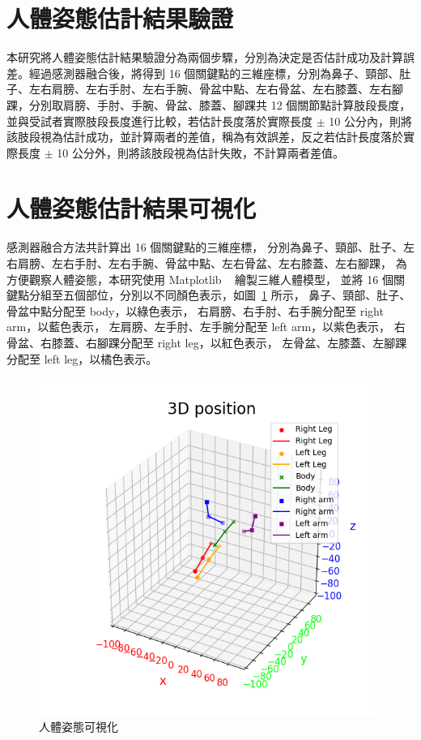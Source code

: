 \section{人體姿態估計結果驗證}
本研究將人體姿態估計結果驗證分為兩個步驟，分別為決定是否估計成功及計算誤差。經過感測器融合後，將得到 16 個關鍵點的三維座標，分別為鼻子、頸部、肚子、左右肩膀、左右手肘、左右手腕、骨盆中點、左右骨盆、左右膝蓋、左右腳踝，分別取肩膀、手肘、手腕、骨盆、膝蓋、腳踝共 12 個關節點計算肢段長度，並與受試者實際肢段長度進行比較，若估計長度落於實際長度 $\pm$ 10 公分內，則將該肢段視為估計成功，並計算兩者的差值，稱為有效誤差，反之若估計長度落於實際長度 $\pm$ 10 公分外，則將該肢段視為估計失敗，不計算兩者差值。

\section{人體姿態估計結果可視化}
感測器融合方法共計算出 16 個關鍵點的三維座標，
分別為鼻子、頸部、肚子、左右肩膀、左右手肘、左右手腕、骨盆中點、左右骨盆、左右膝蓋、左右腳踝，
為方便觀察人體姿態，本研究使用 Matplotlib ~\cite{Hunter:2007} 繪製三維人體模型，
並將 16 個關鍵點分組至五個部位，分別以不同顏色表示，如圖~\ref{ch3_fig_posevis} 所示，
鼻子、頸部、肚子、骨盆中點分配至 body，以綠色表示，
右肩膀、右手肘、右手腕分配至 right arm，以藍色表示，
左肩膀、左手肘、左手腕分配至 left arm，以紫色表示，
右骨盆、右膝蓋、右腳踝分配至 right leg，以紅色表示，
左骨盆、左膝蓋、左腳踝分配至 left leg，以橘色表示。

\begin{figure}[!ht]
   \centering
   \includegraphics[width=11cm]{figure/ch3_fig_posevis.png}
    \caption[人體姿態可視化]{人體姿態可視化}
    \label{ch3_fig_posevis}
\end{figure}

